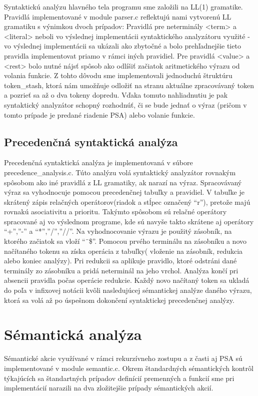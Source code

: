 \documentclass{article}
\begin{document}
	Syntaktickú analýzu hlavného tela programu sme založili na LL(1) gramatike. Pravidlá implementované v module parser.c reflektujú nami vytvorenú LL gramatiku s výnimkou dvoch prípadov:
	Pravidlá pre neterminály <term> a <literal> neboli vo výslednej implementácii syntaktického analyzátoru využité - vo výslednej implementácii sa ukázali ako zbytočné a bolo prehľadnejšie tieto pravidla implementovat priamo v rámci iných pravidiel.
	Pre pravidlá <value> a <rest> bolo nutné nájsť spôsob ako odlíšiť začiatok aritmetického výrazu od volania funkcie. Z tohto dôvodu sme implementovali jednoduchú štruktúru token\_stash, ktorá nám umožňuje odložiť na stranu aktuálne zpracovávaný token a pozrieť sa až o dva tokeny dopredu. Vďaka tomuto nahliadnutiu je pak syntaktický analyzátor schopný rozhodnúť, či se bude jednať o výraz (pričom v tomto prípade je predané riadenie PSA) alebo volanie funkcie.
	

	\subsection{Precedenčná syntaktická analýza}
	Precedenčná syntaktická analýza je implementovaná v súbore precedence\_analysis.c. Túto analýzu volá syntaktický analyzátor rovnakým spôsobom ako iné pravidlá z LL gramatiky, ak narazí na výraz. 
	Spracovávaný výraz sa vyhodnocuje pomocou precedenčnej tabuľky a pravidiel. V tabuľke je skrátený zápis relačných operátorov(riadok a stĺpec označený “r”), pretože majú rovnakú asociativitu a prioritu. Takýmto spôsobom sú relačné operátory spracované aj vo výslednom programe, kde sú navyše takto skrátene aj operátory “+”,”-” a “*”,”/”,”//”. Na vyhodnocovanie výrazu je použitý zásobník, na ktorého začiatok sa vloží “¨\$”. Pomocou prvého terminálu na zásobníku a novo načítaného tokenu sa získa operácia z tabuľky( vloženie na zásobník, redukcia alebo koniec analýzy). Pri redukcii sa aplikuje  pravidlo, ktoré odstráni dané terminály zo zásobníku a pridá neterminál na jeho vrchol. Analýza končí pri absencii pravidla počas operácie redukcie. Každý novo načítaný token sa ukladá do poľa v infixovej notácii kvôli nasledujúcej sémantickej analýze daného výrazu, ktorá sa volá až po úspešnom dokončení syntaktickej precedenčnej analýzy.
	

	\section{Sémantická analýza}
	Sémantické akcie využívané v rámci rekurzívneho zostupu a z časti aj PSA sú implementované v module semantic.c. 
	Okrem štandardných sémantických kontrôl týkajúcích sa štandartných prípadov definícií premenných a funkcií sme pri implementácií narazili na dva zložitejšie prípady sémantických akcií.
\end{document}
